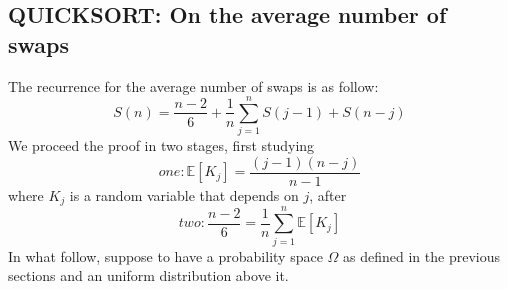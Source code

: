 \subsection{QUICKSORT: On the average number of swaps}
The recurrence for the average number of swaps is as follow:
\begin{displaymath}
  S(n) =  \frac{n-2}{6} +  \frac{1}{n} \sum_{j=1}^{n}{S(j-1) + S(n-j)} 
\end{displaymath}
We proceed the proof in two stages, first studying
\begin{displaymath}
  one: \mathbb{E} \left[K_j \right]  = \frac{(j-1)(n-j)}{n-1} 
\end{displaymath}
where $K_j$ is a random variable that depends on $j$, after
\begin{displaymath}
  two: \frac{n-2}{6} = \frac{1}{n}\sum_{j=1}^{n}{
    \mathbb{E} \left[K_j \right] }
\end{displaymath}
In what follow, suppose to have a probability space $\Omega$ as
defined in the previous sections and an uniform distribution above it.
